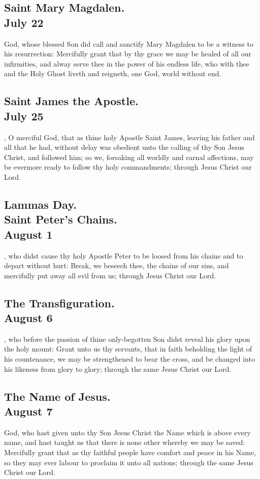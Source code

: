 \subsection{Saint Mary Magdalen.\\
July 22}
 God, whose blessed Son did call and sanctify Mary Magdalen to be a witness to his resurrection: Mercifully grant that by thy grace we may be healed of all our infirmities, and alway serve thee in the power of his endless life, who with thee and the Holy Ghost liveth and reigneth, one God, world without end.

\subsection{Saint James the Apostle.\\
July 25}
, O merciful God, that as thine holy Apostle Saint James, leaving his father and all that he had, without delay was obedient unto the calling of thy Son Jesus Christ, and followed him; so we, forsaking all worldly and carnal affections, may be evermore ready to follow thy holy commandments; through Jesus Christ our Lord.

\subsection{Lammas Day.\\
Saint Peter's Chains.\\
August 1}
, who didst cause thy holy Apostle Peter to be loosed from his chains and to depart without hurt: Break, we beseech thee, the chains of our sins, and mercifully put away all evil from us; through Jesus Christ our Lord.

\subsection{The Transfiguration.\\
August 6}
, who before the passion of thine only-begotten Son didst reveal his glory upon the holy mount: Grant unto us thy servants, that in faith beholding the light of his countenance, we may be strengthened to bear the cross, and be changed into his likeness from glory to glory; through the same Jesus Christ our Lord.

\subsection{The Name of Jesus.\\
August 7}
 God, who hast given unto thy Son Jesus Christ the Name which is above every name, and hast taught us that there is none other whereby we may be saved: Mercifully grant that as thy faithful people have comfort and peace in his Name, so they may ever labour to proclaim it unto all nations; through the same Jesus Christ our Lord.

